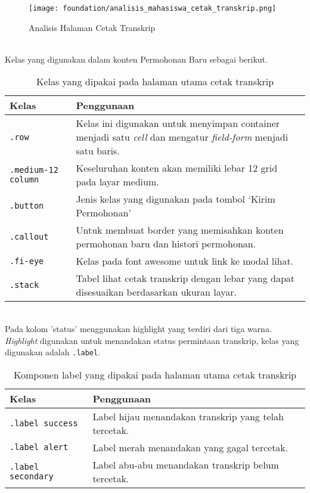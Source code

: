 \begin{figure} [H]
	\centering  
	\texttt{[image: foundation/analisis\_mahasiswa\_cetak\_transkrip.png]}
	\caption{Analisis Halaman Cetak Transkrip} 
\end{figure} \\

\noindent Kelas yang digunakan dalam konten Permohonan Baru sebagai berikut.\\

\begin{table}[H]
	\centering
	\begin{tabularx}{\textwidth}{lX}
		\toprule
		Kelas     & Penggunaan \\
		\midrule
		\texttt{.row} & Kelas ini digunakan untuk menyimpan container menjadi satu \textit{cell} dan mengatur \textit{field-form} menjadi satu baris. \\
		\texttt{.medium-12 column}& Keseluruhan konten akan memiliki lebar 12 grid pada layar medium.\\
		\texttt{.button} & Jenis kelas yang digunakan pada tombol `Kirim Permohonan'\\
		\texttt{.callout} & Untuk membuat border yang memisahkan konten permohonan baru dan histori permohonan.\\
		\texttt{.fi-eye}& Kelas pada font awesome untuk link ke modal lihat.\\		
		\texttt{.stack} & Tabel lihat cetak transkrip dengan lebar yang dapat disesuaikan berdasarkan ukuran layar.\\
		\bottomrule
	\end{tabularx}%
	\caption{Kelas yang dipakai pada halaman utama cetak transkrip}
\end{table} \\ 

\noindent Pada kolom 'status' menggunakan highlight yang terdiri dari tiga warna. \textit{Highlight} digunakan untuk menandakan status permintaan transkrip, kelas yang digunakan adalah \texttt{.label}.\\

\begin{table}[H]
	\centering
	\begin{tabularx}{\textwidth}{lX}
		\toprule
		Kelas & Penggunaan \\
		\midrule
		\texttt{.label success} & Label hijau menandakan transkrip yang telah tercetak.\\
		\texttt{.label alert} & Label merah menandakan yang gagal tercetak.\\
		\texttt{.label secondary} & Label abu-abu menandakan transkrip belum tercetak.\\
		\bottomrule
	\end{tabularx}%
	\caption{Komponen label yang dipakai pada halaman utama cetak transkrip}
\end{table}%

